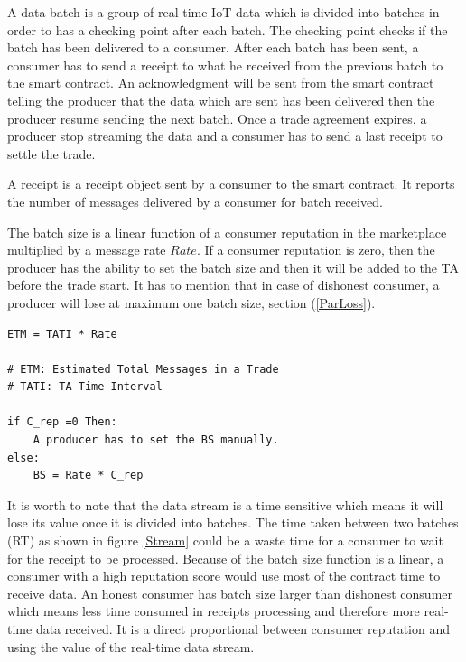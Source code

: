 \documentclass[letterpaper, 10 pt, conference]{ieeeconf}  %
\begin{document}
A data batch is a group of real-time IoT data which is divided into batches in order to has a checking point after each batch. The checking point checks if the batch has been delivered to a consumer. After each batch has been sent, a consumer has to send a receipt to what he received from the previous batch to the smart contract. An acknowledgment will be sent from the smart contract telling the producer that the data which are sent has been delivered then the producer resume sending the next batch. Once a trade agreement expires, a producer stop streaming the data and a consumer has to send a last receipt to settle the trade.

A receipt is a receipt object sent by a consumer to the smart contract. It reports the number of messages delivered by a consumer for batch received.



The batch size is a linear function of a consumer reputation in the marketplace multiplied by a message rate $Rate$. If a consumer reputation is zero, then the producer has the ability to set the batch size and then it will be added to the TA before the trade start. It has to mention that in case of dishonest consumer, a producer will lose at maximum one batch size, section (\ref{ParLoss}).

\begin{lstlisting}[basicstyle=\smaller, frame=single]
ETM = TATI * Rate      

# ETM: Estimated Total Messages in a Trade 
# TATI: TA Time Interval
 
if C_rep =0 Then:
    A producer has to set the BS manually.
else:
    BS = Rate * C_rep

\end{lstlisting}

It is worth to note that the data stream is a time sensitive which means it will lose its value once it is divided into batches. The time taken between two batches (RT) as shown in figure \ref{Stream} could be a waste time for a consumer to wait for the receipt to be processed. Because of the batch size function is a linear, a consumer with a high reputation score would use most of the contract time to receive data. An honest consumer has batch size larger than dishonest consumer which means less time consumed in receipts processing and therefore more real-time data received. It is a direct proportional between consumer reputation and using the value of the real-time data stream. 
\end{document}
